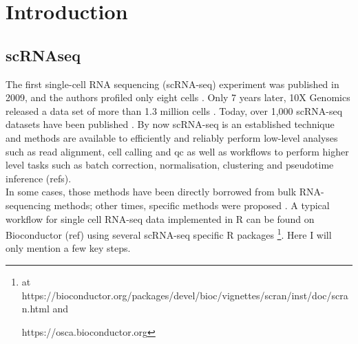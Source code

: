 \newpage

\section{Introduction}

\subsection{scRNAseq}

The first single-cell RNA sequencing (scRNA-seq) experiment was published in 2009, and the authors profiled only eight cells \cite{tang2009mrna}. 
Only 7 years later, 10X Genomics released a data set of more than 1.3 million cells \cite{102016our}.
Today, over 1,000 scRNA-seq datasets have been published \cite{svensson2018exponential, svensson2019curated, svensson2020single}.
By now scRNA-seq is an established technique and methods are available to efficiently and reliably perform low-level analyses such as read alignment, cell calling and \gls{qc} as well as workflows to perform higher level tasks such as batch correction, normalisation, clustering and pseudotime inference (refs).\\

In some cases, those methods have been directly borrowed from bulk RNA-sequencing methods; other times, specific methods were proposed \cite{stegle2015computational}.
A typical workflow for single cell RNA-seq data implemented in R can be found on Bioconductor (ref) using several scRNA-seq specific R packages \cite{lun2016step, risso2016scrnaseq, mccarthy2017scater, lun2019singlecellexperiment}\footnote{at https://bioconductor.org/packages/devel/bioc/vignettes/scran/inst/doc/scran.html and

https://osca.bioconductor.org}.
Here I will only mention a few key steps.







